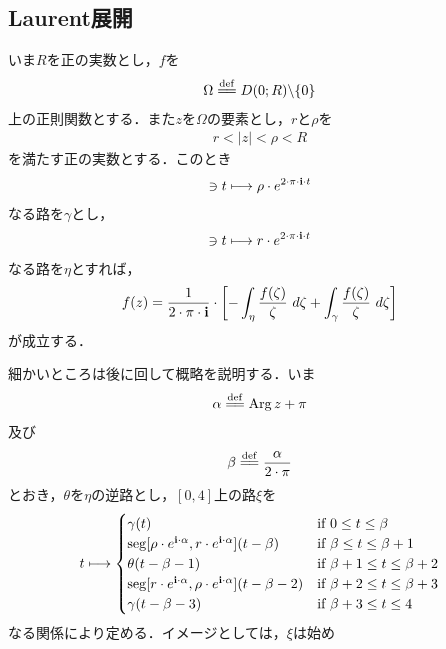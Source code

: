 \subsection{Laurent展開}
	
	いま$R$を正の実数とし，$f$を
	\begin{align}
		\Omega \defeq \disc{0}{R} \backslash \{0\}
	\end{align}
	上の正則関数とする．また$z$を$\Omega$の要素とし，$r$と$\rho$を
	\begin{align}
		r < |z| < \rho < R
	\end{align}
	を満たす正の実数とする．このとき
	\begin{align}
		[0,1] \ni t \longmapsto \rho \cdot e^{2 \cdot \pi \cdot \isym \cdot t}
	\end{align}
	なる路を$\gamma$とし，
	\begin{align}
		[0,1] \ni t \longmapsto r \cdot e^{2 \cdot \pi \cdot \isym \cdot t}
	\end{align}
	なる路を$\eta$とすれば，
	\begin{align}
		f(z) = \frac{1}{2 \cdot \pi \cdot \mathbf{i}} \cdot 
		\left[-\int_{\eta} \frac{f(\zeta)}{\zeta}\ d\zeta + \int_{\gamma} \frac{f(\zeta)}{\zeta}\ d\zeta\right]
		\label{fom:Laurent_series_1}
	\end{align}
	が成立する．
	
	細かいところは後に回して概略を説明する．いま
	\begin{align}
		\alpha \defeq \pvarg{z} + \pi
	\end{align}
	及び
	\begin{align}
		\beta \defeq \frac{\alpha}{2 \cdot \pi}
	\end{align}
	とおき，$\theta$を$\eta$の逆路とし，$[0,4]$上の路$\xi$を
	\begin{align}
		t \longmapsto
		\begin{cases}
			\gamma(t) & \mbox{if } 0 \leq t \leq \beta \\
			\operatorname{seg}[\rho \cdot e^{\mathbf{i} \cdot \alpha},r \cdot e^{\mathbf{i} \cdot \alpha}](t-\beta) & \mbox{if } \beta \leq t \leq \beta + 1 \\
			\theta(t-\beta-1) & \mbox{if } \beta + 1 \leq t \leq \beta + 2 \\
			 \operatorname{seg}[r \cdot e^{\mathbf{i} \cdot \alpha},\rho \cdot e^{\mathbf{i} \cdot \alpha}](t-\beta-2) & \mbox{if } \beta + 2 \leq t \leq \beta + 3 \\
			\gamma(t-\beta-3) & \mbox{if } \beta + 3 \leq t \leq 4
		\end{cases}
	\end{align}
	なる関係により定める．イメージとしては，$\xi$は始め
	

